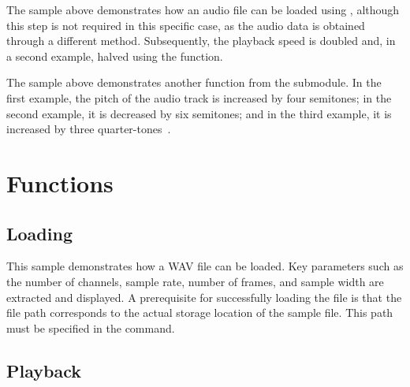 The sample above demonstrates how an audio file can be loaded using , although this step is not required in this specific case, as the audio data is obtained through a different method.  
Subsequently, the playback speed is doubled and, in a second example, halved using the  function.

\begin{code}[!htp]
	\caption{Demonstrates pitch shifting in audio using Librosa's pitch manipulation functions} 
	\label{Code:Python:File:PitchShiftingLibrosa}
\end{code}

The sample above demonstrates another function from the  submodule.  
In the first example, the pitch of the audio track is increased by four semitones;  
in the second example, it is decreased by six semitones;  
and in the third example, it is increased by three quarter-tones~\cite{McFee:2023}.

\section{Functions}

\subsection{Loading}

\begin{code}[!htp]
	\caption{Extracts and prints basic audio properties from a WAV file} 
	\label{Code:Python:File:waveFileInfoReader}
\end{code}


This sample demonstrates how a WAV file can be loaded.  
Key parameters such as the number of channels, sample rate, number of frames, and sample width are extracted and displayed.  
A prerequisite for successfully loading the file is that the file path corresponds to the actual storage location of the sample file.  
This path must be specified in the  command.


\subsection{Playback}

\begin{code}[!htp]
	\caption{Simple wave file playback using PyAudio and the wave module} 
	\label{Code:Python:File:playAudioWithPyAudio}
\end{code}    

